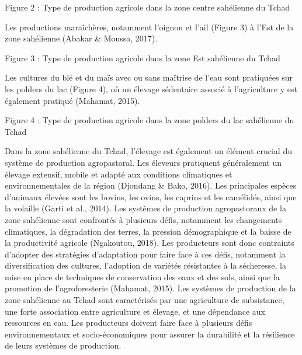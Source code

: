 \documentclass[12pt,oneside]{report}
\begin{document}
Figure 2 : Type de production agricole dans la zone centre sahélienne du Tchad

Les productions maraîchères, notamment l'oignon et l'ail (Figure 3) à l'Est de la zone sahélienne (Abakar \& Moussa, 2017).

Figure 3 : Type de production agricole dans la zone Est sahélienne du Tchad

Les cultures du blé et du maïs avec ou sans maîtrise de l'eau sont pratiquées sur les polders du lac (Figure 4), où un élevage sédentaire associé à l'agriculture y est également pratiqué (Mahamat, 2015).

Figure 4 : Type de production agricole dans la zone polders du lac sahélienne du Tchad

Dans la zone sahélienne du Tchad, l'élevage est également un élément crucial du système de production agropastoral. Les éleveurs pratiquent généralement un élevage extensif, mobile et adapté aux conditions climatiques et environnementales de la région (Djondang \& Bako, 2016). Les principales espèces d'animaux élevées sont les bovins, les ovins, les caprins et les camélidés, ainsi que la volaille (Garti et al., 2014). Les systèmes de production agropastoraux de la zone sahélienne sont confrontés à plusieurs défis, notamment les changements climatiques, la dégradation des terres, la pression démographique et la baisse de la productivité agricole (Ngakoutou, 2018). Les producteurs sont donc contraints d'adopter des stratégies d'adaptation pour faire face à ces défis, notamment la diversification des cultures, l'adoption de variétés résistantes à la sécheresse, la mise en place de techniques de conservation des eaux et des sols, ainsi que la promotion de l'agroforesterie (Mahamat, 2015). Les systèmes de production de la zone sahélienne au Tchad sont caractérisés par une agriculture de subsistance, une forte association entre agriculture et élevage, et une dépendance aux ressources en eau. Les producteurs doivent faire face à plusieurs défis environnementaux et socio-économiques pour assurer la durabilité et la résilience de leurs systèmes de production.
\end{document}
